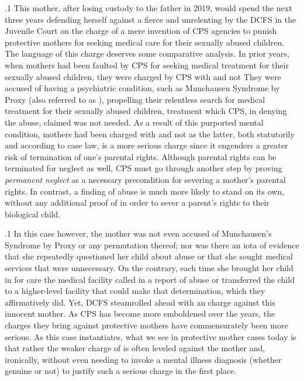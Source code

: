 \documentclass[11pt, twoside]{article}
\begin{document}
{\p.1{%
\noindent{}This mother, after losing custody to the father in 2019, would spend the
next three years defending herself against a fierce and unrelenting  by the DCFS in the Juvenile Court on the charge of \mdash{}a mere invention of CPS agencies to punish protective
mothers for seeking medical care for their sexually abused children.
The language of this charge deserves some comparative analysis. In
prior years, when mothers had been faulted by CPS for seeking medical
treatment for their sexually abused children, they were charged by CPS
with  and not  They were accused of having a psychiatric condition, such as Munchausen Syndrome by Proxy (also referred
to as ), propelling their relentless search for
medical treatment for their sexually abused children, treatment which
CPS, in denying the abuse, claimed was not needed. As a result of this
purported mental condition, mothers had been charged with 
and not  as the latter, both statutorily and according to case law,
is a more serious charge since it engenders a greater risk of termination of one's parental rights. Although parental rights can be terminated
for neglect as well, CPS must go through another step by proving \textit{permanent neglect} as a necessary precondition for severing a mother's
parental rights. In contrast, a finding of abuse is much more likely to
stand on its own, without any additional proof of  in order to sever
a parent's rights to their biological child.
}%

\p.1{%
In this case however, the mother was not even accused of Munchausen's Syndrome by Proxy or any permutation thereof; nor was there
an iota of evidence that she repeatedly questioned her child about abuse
or that she sought medical services that were unnecessary. On the contrary, each time she brought her child in for care the medical facility
called in a report of abuse or transferred the child to a higher-level facility that could make that determination, which they affirmatively did.
Yet, DCFS steamrolled ahead with an  charge against this innocent mother. As CPS has become more emboldened over the years,
the charges they bring against protective mothers have commensurately
been more serious. As this case instantiates, what we see in protective
mother cases today is that  rather the weaker charge of 
is often leveled against the mother and, ironically, without even needing
to invoke a mental illness diagnosis (whether genuine or not) to justify
such a serious charge in the first place.
}%

}
\end{document}
